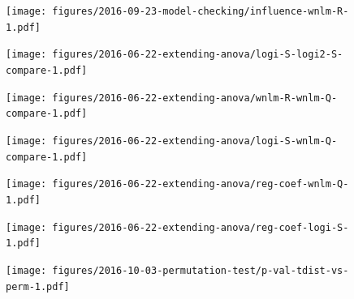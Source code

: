 \documentclass[letterpaper]{article}
\begin{document}
\begin{figure}
\begin{center}
\texttt{[image: figures/2016-09-23-model-checking/influence-wnlm-R-1.pdf]}
\end{center}
\caption{}
\label{fig:influence-wnlm.R}
\end{figure}

\begin{figure}
\begin{center}
\texttt{[image: figures/2016-06-22-extending-anova/logi-S-logi2-S-compare-1.pdf]}
\end{center}
\caption{}
\label{fig:logi-S-logi2-S-compare}
\end{figure}

\begin{figure}
\begin{center}
\texttt{[image: figures/2016-06-22-extending-anova/wnlm-R-wnlm-Q-compare-1.pdf]}
\end{center}
\caption{}
\label{fig:wnlm-R-wnlm-Q-compare}
\end{figure}

\begin{figure}
\begin{center}
\texttt{[image: figures/2016-06-22-extending-anova/logi-S-wnlm-Q-compare-1.pdf]}
\end{center}
\caption{}
\label{fig:logi-S-wnlm-Q-compare}
\end{figure}

\begin{figure}
\begin{center}
\texttt{[image: figures/2016-06-22-extending-anova/reg-coef-wnlm-Q-1.pdf]}
\end{center}
\caption{}
\label{fig:all-effects-wnlm.Q}
\end{figure}

\begin{figure}
\begin{center}
\texttt{[image: figures/2016-06-22-extending-anova/reg-coef-logi-S-1.pdf]}
\end{center}
\caption{}
\label{fig:all-effects-logi.S}
\end{figure}

\begin{figure}
\begin{center}
\texttt{[image: figures/2016-10-03-permutation-test/p-val-tdist-vs-perm-1.pdf]}
\end{center}
\caption{}
\label{fig:p-val-tdist-vs-perm}
\end{figure}
\end{document}
